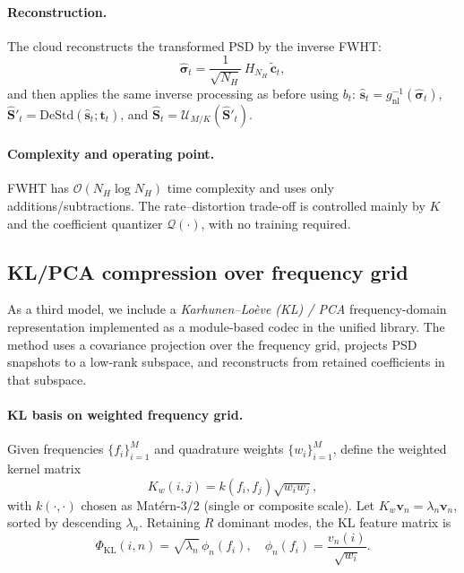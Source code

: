 \documentclass[11pt]{article}
\begin{document}
\paragraph{Reconstruction.}
The cloud reconstructs the transformed PSD by the inverse FWHT:
\begin{equation}
\hat{\bm{\sigma}}_t = \frac{1}{\sqrt{N_H}}\,H_{N_H}\,\tilde{\mathbf{c}}_t,
\end{equation}
and then applies the same inverse processing as before using $b_t$:
$\hat{\mathbf{s}}_t=g_{\mathrm{nl}}^{-1}(\hat{\bm{\sigma}}_t)$,
$\hat{\mathbf{S}}'_t=\mathrm{DeStd}(\hat{\mathbf{s}}_t;\mathbf{t}_t)$,
and $\hat{\mathbf{S}}_t=\mathcal{U}_{M/K}(\hat{\mathbf{S}}'_t)$.

\paragraph{Complexity and operating point.}
FWHT has $\mathcal{O}(N_H\log N_H)$ time complexity and uses only additions/subtractions.
The rate--distortion trade-off is controlled mainly by $K$ and the coefficient quantizer $\mathcal{Q}(\cdot)$,
with no training required.

\subsection{KL/PCA compression over frequency grid}
As a third model, we include a \emph{Karhunen--Lo\`eve (KL) / PCA} frequency-domain representation
implemented as a module-based codec in the unified library. The method uses a covariance projection over
the frequency grid, projects PSD snapshots to a low-rank subspace, and reconstructs from retained
coefficients in that subspace.

\paragraph{KL basis on weighted frequency grid.}
Given frequencies $\{f_i\}_{i=1}^{M}$ and quadrature weights $\{w_i\}_{i=1}^{M}$, define the weighted
kernel matrix
\begin{equation}
K_w(i,j) = k(f_i,f_j)\sqrt{w_iw_j},
\end{equation}
with $k(\cdot,\cdot)$ chosen as Mat\'ern-$3/2$ (single or composite scale). Let
$K_w \mathbf{v}_n=\lambda_n \mathbf{v}_n$, sorted by descending $\lambda_n$. Retaining $R$ dominant modes,
the KL feature matrix is
\begin{equation}
\Phi_{\mathrm{KL}}(i,n)=\sqrt{\lambda_n}\,\phi_n(f_i), \quad
\phi_n(f_i)=\frac{v_n(i)}{\sqrt{w_i}}.
\end{equation}
\end{document}
